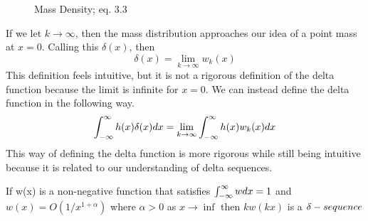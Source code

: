 \begin{figure}
    \centering
    \caption{Mass Density;  eq. 3.3}
\end{figure}

If we let \(k \rightarrow \infty\), then the mass distribution approaches our idea of a point mass at \(x=0\). Calling this \(\delta(x)\), then
\begin{equation} \label{eq:deltaSeqLim}
    \delta(x) = \lim_{k\rightarrow \infty} w_k(x)
\end{equation}
This definition feels intuitive, but it is not a rigorous definition of the delta function because the limit is infinite for \(x=0\). We can instead define the delta function in the following way.
\begin{equation}
    \int_{-\infty}^{\infty} h(x)\delta(x)dx = \lim_{k\rightarrow \infty}\int_{-\infty}^{\infty} h(x)w_k(x)dx
\end{equation}
This way of defining the delta function is more rigorous while still being intuitive because it is related to our understanding of delta sequences.

\begin{assertion}
    If w(x) is a non-negative function that satisfies \(\int_{-\infty}^{\infty} w dx=1\) and \(w(x)=O(1/x^{1+\alpha})\) where \(\alpha > 0\) as \(x\rightarrow \inf\) then \(kw(kx)\) is a \(\delta-sequence\)
\end{assertion}

